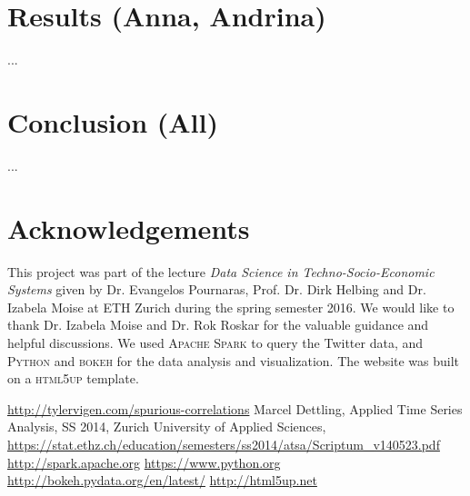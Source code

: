 \documentclass[12pt, a4paper]{article}
\begin{document}
\section{Results (Anna, Andrina)}
...


\section{Conclusion (All)}
...


\section{Acknowledgements}
This project was part of the lecture \textit{Data Science in Techno-Socio-Economic Systems} given by Dr. Evangelos Pournaras, Prof. Dr. Dirk Helbing and Dr. Izabela Moise at ETH Zurich during the spring semester 2016. We would like to thank Dr. Izabela Moise and Dr. Rok Roskar for the valuable guidance and helpful discussions. We used \textsc{Apache Spark} \cite{spark}  to query the Twitter data, and \textsc{Python} \cite{python} and \textsc{bokeh} \cite{bokeh} for the data analysis and visualization. The website was built on a \textsc{html5up} \cite{html5up} template.

\begin{thebibliography}{9}

\url{http://tylervigen.com/spurious-correlations}
Marcel Dettling, Applied Time Series Analysis, SS 2014, Zurich University of Applied Sciences, 
\url{https://stat.ethz.ch/education/semesters/ss2014/atsa/Scriptum_v140523.pdf}
\url{http://spark.apache.org}
\url{https://www.python.org}
\url{http://bokeh.pydata.org/en/latest/}
\url{http://html5up.net}

\end{thebibliography}
\end{document}
